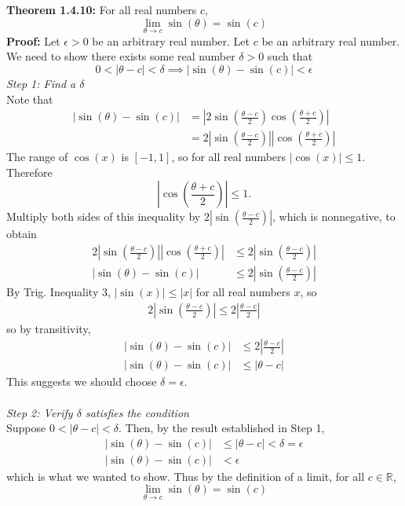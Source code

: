 \documentclass{article}
\begin{document}
	\textbf{Theorem 1.4.10:} For all real numbers $c$,
	$$\lim_{\theta \to c}{\sin{(\theta)}} = \sin{(c)}$$
	\textbf{Proof:}
	Let $\epsilon > 0$ be an arbitrary real number. Let $c$ be an arbitrary real number. We need to show there exists some real number $\delta > 0$ such that
	$$0 < |\theta - c| < \delta \implies |\sin{(\theta)} - \sin{(c)}| < \epsilon$$
	\textit{Step 1: Find a $\delta$} \\
	Note that
	\begin{align*}
		|\sin{(\theta)} - \sin{(c)}| &= \left|2\sin{\left(\frac{\theta - c}{2}\right)}\cos{\left(\frac{\theta + c}{2}\right)}\right| \tag{Sum to Product Formula} \\
									 &= 2\left|\sin{\left(\frac{\theta - c}{2}\right)}\right|\left|\cos{\left(\frac{\theta + c}{2}\right)} \right|
	\end{align*}
	The range of $\cos{(x)}$ is $[-1, 1]$, so for all real numbers $|\cos{(x)}| \leq 1$. Therefore
	$$\left|\cos{\left(\frac{\theta + c}{2}\right)} \right| \leq 1.$$
	Multiply both sides of this inequality by $2\left|\sin{\left(\frac{\theta - c}{2}\right)}\right|$, which is nonnegative, to obtain
	\begin{align*}
		2\left|\sin{\left(\frac{\theta - c}{2}\right)}\right|\left|\cos{\left(\frac{\theta + c}{2}\right)} \right| &\leq 2\left|\sin{\left(\frac{\theta - c}{2}\right)}\right| \\
		|\sin{(\theta)} - \sin{(c)}| &\leq 2\left|\sin{\left(\frac{\theta - c}{2}\right)}\right|
	\end{align*}
	By Trig. Inequality 3, $|\sin(x)| \leq |x|$ for all real numbers $x$, so
	\begin{align*}
		2\left|\sin{\left(\frac{\theta - c}{2}\right)}\right| \leq 2\left|\frac{\theta - c}{2}\right|
	\end{align*}
	so by transitivity,
	\begin{align*}
		|\sin{(\theta)} - \sin{(c)}| &\leq 2\left|\frac{\theta - c}{2}\right| \\
		|\sin{(\theta)} - \sin{(c)}| &\leq |\theta - c|
	\end{align*}
	This suggests we should choose $\delta = \epsilon$. \\\\
	\textit{Step 2: Verify $\delta$ satisfies the condition} \\
	Suppose $0 < |\theta - c| < \delta$. Then, by the result established in Step 1,
	\begin{align*}
		|\sin{(\theta)} - \sin{(c)}| &\leq |\theta - c| < \delta = \epsilon \\
		|\sin{(\theta)} - \sin{(c)}| &< \epsilon
	\end{align*}
	which is what we wanted to show. Thus by the definition of a limit, for all $c \in \mathbb{R}$,
	$$\lim_{\theta \to c}{\sin{(\theta)}} = \sin{(c)}$$
\end{document}
